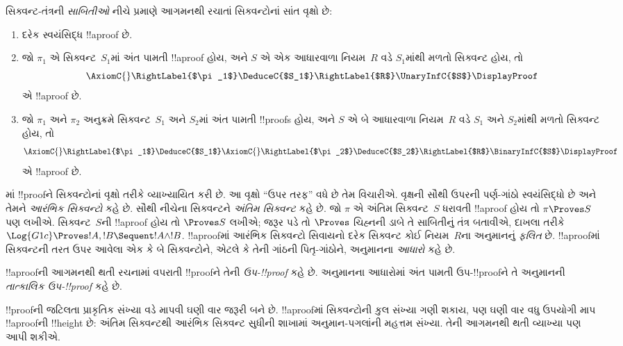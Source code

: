 \documentclass[../../../include/open-logic-section]{subfiles}
\begin{document}
\begin{defn}
સિક્વન્ટ-તંત્રની \emph{સાબિતીઓ} નીચે પ્રમાણે
આગમનથી રચાતાં સિક્વન્ટોનાં સાંત વૃક્ષો છે:
\begin{enumerate}
  \item{} દરેક સ્વયંસિદ્ધ !!a{proof} છે.
  \item{} જો $\pi_1$ એ
  સિક્વન્ટ~$S_1$માં અંત પામતી !!a{proof} હોય, અને $S$ એ
  એક આધારવાળા નિયમ~$R$ વડે $S_1$માંથી મળતો સિક્વન્ટ હોય, તો
  \[
  \AxiomC{}
  \RightLabel{$\pi_1$}
  \DeduceC{$S_1$}
  \RightLabel{$R$}
  \UnaryInfC{$S$}
  \DisplayProof
  \]
  એ !!a{proof} છે.
  \item{} જો $\pi_1$ અને $\pi_2$
  અનુક્રમે સિક્વન્ટ~$S_1$ અને $S_2$માં અંત પામતી !!{proof}s
  હોય, અને $S$ એ બે આધારવાળા નિયમ~$R$ વડે $S_1$ અને $S_2$માંથી
  મળતો સિક્વન્ટ હોય, તો
  \[
  \AxiomC{}
  \RightLabel{$\pi_1$}
  \DeduceC{$S_1$}
  \AxiomC{}
  \RightLabel{$\pi_2$}
  \DeduceC{$S_2$}
  \RightLabel{$R$}
  \BinaryInfC{$S$}
  \DisplayProof
  \]
  એ !!a{proof} છે.
\end{enumerate}
\end{defn}

માં !!{proof}ને સિક્વન્ટોનાં વૃક્ષો
તરીકે વ્યાખ્યાયિત કરી છે. આ વૃક્ષો ``ઉપર તરફ''
વધે છે તેમ વિચારીએ. વૃક્ષની સૌથી ઉપરની પર્ણ-ગાંઠો
સ્વયંસિદ્ધો છે અને તેમને \emph{આરંભિક સિક્વન્ટો} કહે છે.
સૌથી નીચેના સિક્વન્ટને \emph{અંતિમ સિક્વન્ટ} કહે છે.
જો $\pi$ એ અંતિમ સિક્વન્ટ~$S$ ધરાવતી !!a{proof} હોય તો
$\pi \Proves S$ પણ લખીએ. સિક્વન્ટ~$S$ની !!a{proof}
હોય તો $\Proves S$ લખીએ; જરૂર પડે તો $\Proves$ ચિહ્નની
ડાબે તે સાબિતીનું તંત્ર બતાવીએ, દાખલા તરીકે
$\Log{G1c} \Proves !A, !B \Sequent !A \land
!B$. !!a{proof}માં આરંભિક સિક્વન્ટો સિવાયનો દરેક સિક્વન્ટ
કોઈ નિયમ~$R$ના અનુમાનનું \emph{ફલિત} છે.
!!a{proof}માં સિક્વન્ટની તરત ઉપર આવેલા એક કે બે સિક્વન્ટોને,
એટલે કે તેની ગાંઠની પિતૃ-ગાંઠોને, અનુમાનના \emph{આધારો} કહે છે.

!!a{proof}ની આગમનથી થતી રચનામાં વપરાતી
!!{proof}ને તેની \emph{ઉપ-!!{proof}} કહે છે.
અનુમાનના આધારોમાં અંત પામતી ઉપ-!!{proof}ને
તે અનુમાનની \emph{તાત્કાલિક ઉપ-!!{proof}} કહે છે.

!!{proof}ની જટિલતા પ્રાકૃતિક સંખ્યા વડે માપવી ઘણી વાર
જરૂરી બને છે. !!a{proof}માં સિક્વન્ટોની કુલ સંખ્યા ગણી શકાય,
પણ ઘણી વાર વધુ ઉપયોગી માપ !!a{proof}ની !!{height} છે:
અંતિમ સિક્વન્ટથી આરંભિક સિક્વન્ટ સુધીની શાખામાં અનુમાન-પગલાંની
મહત્તમ સંખ્યા. તેની આગમનથી થતી વ્યાખ્યા પણ આપી શકીએ.
\end{document}

